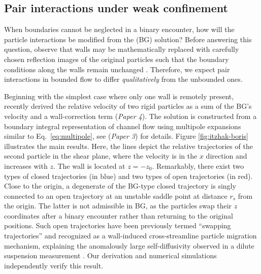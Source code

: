\subsection{Pair interactions under weak confinement}

When boundaries cannot be neglected in a binary encounter, how will the particle interactions be modified from the \cite{batchelor_green_1972} (BG) solution?
Before answering this question, observe that walls may be mathematically replaced with carefully chosen reflection images of the original particles such that the boundary conditions along the walls remain unchanged \citep{blake_1971, LironMochon}.
Therefore, we expect pair interactions in bounded flow to differ \emph{qualitatively} from the unbounded ones.

Beginning with the simplest case where only one wall is remotely present, \cite{Fouxon_Rubinstein2019} recently derived the relative velocity of two rigid particles as a sum of the BG's velocity and a wall-correction term (\emph{Paper 4}). The solution is constructed from a boundary integral representation of channel flow using multipole expansions similar to Eq.\ \eqref{eq:multipole}, see \cite{Fouxon_2017} (\emph{Paper 3}) for details.
Figure \ref{fig:itzhak-boris} illustrates the main results.
Here, the lines depict the relative trajectories of the second particle in the shear plane, where the velocity is in the $x$ direction and increases with $z$. The wall is located at $z=-z_0$.
Remarkably, there exist two types of closed trajectories (in blue) and two types of open trajectories (in red).
Close to the origin, a degenerate of the BG-type closed trajectory is singly connected to an open trajectory at an unstable saddle point at distance $r_s$ from the origin.
The latter is not admissible in BG, as the particles swap their $z$ coordinates after a binary encounter rather than returning to the original positions.
Such open trajectories have been previously termed ``swapping trajectories'' and recognized as a wall-induced cross-streamline particle migration mechanism, explaining the anomalously large self-diffusivity observed in a dilute suspension measurement \citep{Zarraga_Leighton2002, zurita-gotor_2007}.
Our derivation and numerical simulations independently verify this result.


